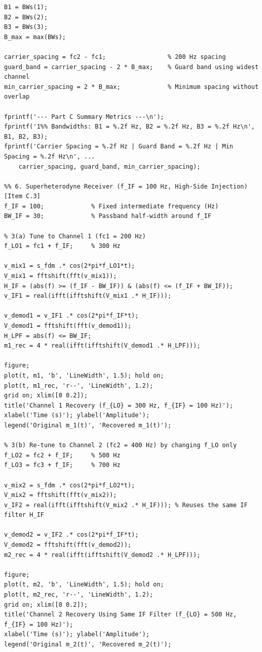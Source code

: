 \documentclass[a4paper]{article}
\begin{document}
\begin{lstlisting}[frame=single, breaklines=true, basicstyle=\ttfamily\scriptsize]
B1 = BWs(1);
B2 = BWs(2);
B3 = BWs(3);
B_max = max(BWs);

carrier_spacing = fc2 - fc1;                 % 200 Hz spacing
guard_band = carrier_spacing - 2 * B_max;    % Guard band using widest channel
min_carrier_spacing = 2 * B_max;             % Minimum spacing without overlap

fprintf('--- Part C Summary Metrics ---\n');
fprintf('1%% Bandwidths: B1 = %.2f Hz, B2 = %.2f Hz, B3 = %.2f Hz\n', B1, B2, B3);
fprintf('Carrier Spacing = %.2f Hz | Guard Band = %.2f Hz | Min Spacing = %.2f Hz\n', ...
    carrier_spacing, guard_band, min_carrier_spacing);

%% 6. Superheterodyne Receiver (f_IF = 100 Hz, High-Side Injection) [Item C.3]
f_IF = 100;             % Fixed intermediate frequency (Hz)
BW_IF = 30;             % Passband half-width around f_IF

% 3(a) Tune to Channel 1 (fc1 = 200 Hz)
f_LO1 = fc1 + f_IF;     % 300 Hz

v_mix1 = s_fdm .* cos(2*pi*f_LO1*t);
V_mix1 = fftshift(fft(v_mix1));
H_IF = (abs(f) >= (f_IF - BW_IF)) & (abs(f) <= (f_IF + BW_IF));
v_IF1 = real(ifft(ifftshift(V_mix1 .* H_IF)));

v_demod1 = v_IF1 .* cos(2*pi*f_IF*t);
V_demod1 = fftshift(fft(v_demod1));
H_LPF = abs(f) <= BW_IF;
m1_rec = 4 * real(ifft(ifftshift(V_demod1 .* H_LPF)));

figure;
plot(t, m1, 'b', 'LineWidth', 1.5); hold on;
plot(t, m1_rec, 'r--', 'LineWidth', 1.2);
grid on; xlim([0 0.2]);
title('Channel 1 Recovery (f_{LO} = 300 Hz, f_{IF} = 100 Hz)');
xlabel('Time (s)'); ylabel('Amplitude');
legend('Original m_1(t)', 'Recovered m_1(t)');

% 3(b) Re-tune to Channel 2 (fc2 = 400 Hz) by changing f_LO only
f_LO2 = fc2 + f_IF;     % 500 Hz
f_LO3 = fc3 + f_IF;     % 700 Hz

v_mix2 = s_fdm .* cos(2*pi*f_LO2*t);
V_mix2 = fftshift(fft(v_mix2));
v_IF2 = real(ifft(ifftshift(V_mix2 .* H_IF))); % Reuses the same IF filter H_IF

v_demod2 = v_IF2 .* cos(2*pi*f_IF*t);
V_demod2 = fftshift(fft(v_demod2));
m2_rec = 4 * real(ifft(ifftshift(V_demod2 .* H_LPF)));

figure;
plot(t, m2, 'b', 'LineWidth', 1.5); hold on;
plot(t, m2_rec, 'r--', 'LineWidth', 1.2);
grid on; xlim([0 0.2]);
title('Channel 2 Recovery Using Same IF Filter (f_{LO} = 500 Hz, f_{IF} = 100 Hz)');
xlabel('Time (s)'); ylabel('Amplitude');
legend('Original m_2(t)', 'Recovered m_2(t)');


\end{lstlisting}
\end{document}
